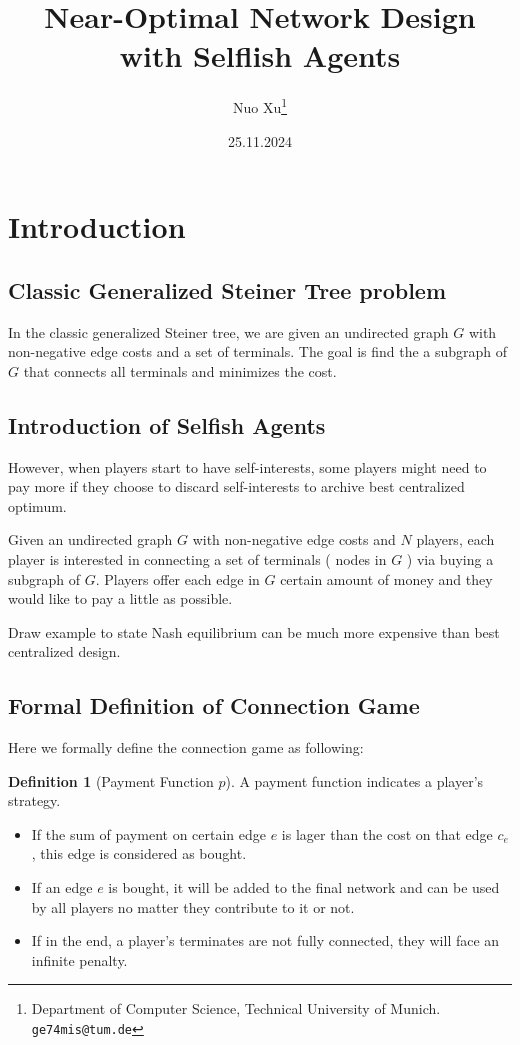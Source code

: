 \documentclass[11pt,psfig,times]{article}
\theoremstyle{theorem}
\theoremstyle{definition}
\newtheorem{definition}{Definition}[section]
\begin{document}
\title{Near-Optimal Network Design with Selflish Agents}
\author{Nuo Xu\thanks{Department of Computer Science, Technical University of Munich. {\tt ge74mis@tum.de}}}
\date{25.11.2024}
\maketitle

\section{Introduction}

\subsection{Classic Generalized Steiner Tree problem}
In the classic generalized Steiner tree, we are given an undirected graph \(G\) with non-negative edge costs and a set of terminals. The goal is find the a subgraph of \(G\) that connects all terminals and minimizes the cost. 

\subsection{Introduction of Selfish Agents}
However, when players start to have self-interests, some players might need to pay more if they choose to discard self-interests to archive best centralized optimum. 

Given an undirected graph \(G\) with non-negative edge costs and \(N\) players, each player is interested in connecting a set of terminals ( nodes in \(G\) ) via buying a subgraph of \(G\). Players offer each edge in \(G\) certain amount of money and they would like to pay a little as possible. 

Draw example to state Nash equilibrium can be much more expensive than best centralized design. 

\subsection{Formal Definition of Connection Game}
Here we formally define the connection game as following:
\begin{definition}[Payment Function \(p\)]
A payment function indicates a player's strategy.
\end{definition}

\begin{itemize}
\item If the sum of payment on certain edge \(e\) is lager than the cost on that edge \(c_e\), this edge is considered as bought.
\item If an edge \(e\) is bought, it will be added to the final network and can be used by all players no matter they contribute to it or not.
\item If in the end, a player's terminates are not fully connected, they will face an infinite penalty.  
\end{itemize}
\end{document}
